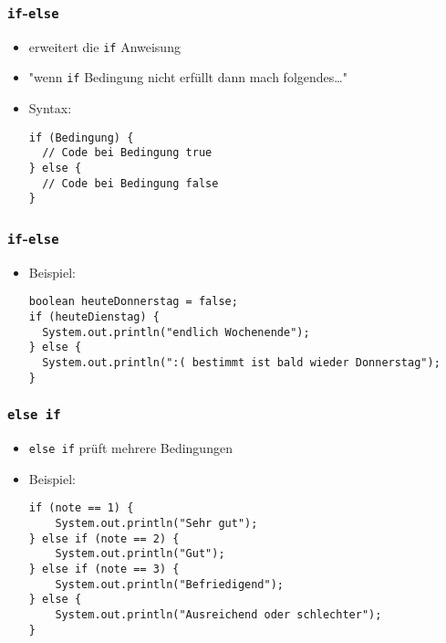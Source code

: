 \documentclass{../../presentation}
\begin{document}
\begin{frame}[fragile]
  \frametitle{\texttt{if}-\texttt{else}}

  \begin{itemize}
    \item<1-> erweitert die \texttt{if} Anweisung
    \item<1-> "wenn \texttt{if} Bedingung nicht erfüllt dann mach folgendes\dots"
    \item<1-> Syntax:
          \begin{verbatim}
if (Bedingung) {
  // Code bei Bedingung true
} else {
  // Code bei Bedingung false
}
\end{verbatim}
  \end{itemize}
\end{frame}

\begin{frame}[fragile]
  \frametitle{\texttt{if}-\texttt{else}}
  \begin{itemize}
    \item<1-> Beispiel:
          \begin{verbatim}
boolean heuteDonnerstag = false;
if (heuteDienstag) {
  System.out.println("endlich Wochenende");
} else {
  System.out.println(":( bestimmt ist bald wieder Donnerstag");
}
\end{verbatim}
  \end{itemize}
\end{frame}

\begin{frame}[fragile]
  \frametitle{\texttt{else if}}
  \begin{itemize}
    \item \texttt{else if} prüft mehrere Bedingungen
    \item Beispiel:
          \begin{verbatim}
if (note == 1) {
    System.out.println("Sehr gut");
} else if (note == 2) {
    System.out.println("Gut");
} else if (note == 3) {
    System.out.println("Befriedigend");
} else {
    System.out.println("Ausreichend oder schlechter");
} 
    \end{verbatim}
  \end{itemize}
\end{frame}
\end{document}
